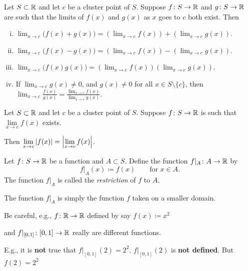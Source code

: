 \documentclass[10pt,aspectratio=169]{beamer}
\begin{document}
\begin{frame}

\begin{corollary}
Let $S \subset {\mathbb{R}}$ and let $c$ be a cluster point of $S$.  
Suppose $f \colon S \to {\mathbb{R}}$ and
$g \colon S \to {\mathbb{R}}$ are 
such that 
the limits of $f(x)$ and $g(x)$ as $x$ goes to $c$ both exist.
\pause
Then
\begin{enumerate}[(i)]
\item
$\displaystyle
\lim_{x\to c} \bigl(f(x)+g(x)\bigr) = \left(\lim_{x\to c} f(x)\right) + 
\left(\lim_{x\to c} g(x)\right) .
$
\item
\pause
$\displaystyle
\lim_{x\to c} \bigl(f(x)-g(x)\bigr) = \left(\lim_{x\to c} f(x)\right) -
\left(\lim_{x\to c} g(x)\right) .
$
\item
\pause
$\displaystyle
\lim_{x\to c} \bigl(f(x)g(x)\bigr) = \left(\lim_{x\to c} f(x)\right)
\left(\lim_{x\to c} g(x)\right) .
$
\item\pause\label{falg:cor:iv}
If
$\displaystyle \lim_{x\to c} g(x) \not= 0$,
and $g(x) \not= 0$ for all $x \in S \setminus \{ c \}$, then
$\displaystyle
\lim_{x\to c} \frac{f(x)}{g(x)} =
\frac{\lim_{x\to c} f(x)}{\lim_{x\to c} g(x)}$.
\end{enumerate}
\end{corollary}

\pause
\begin{corollary}
Let $S \subset {\mathbb{R}}$ and let $c$ be a cluster point of $S$.
Suppose $f \colon S \to {\mathbb{R}}$ is such that $\lim\limits_{x\to c} f(x)$ exists.

\pause
\medskip

Then
\quad
$\displaystyle
\lim_{x\to c} \left\lvert {f(x)} \right\rvert =
\left\lvert {\lim_{x\to c} f(x)} \right\rvert$.
\end{corollary}

\end{frame}

\begin{frame}

\begin{definition}
Let $f \colon S \to {\mathbb{R}}$ be a function and $A \subset S$.  Define the
function $f|_A \colon A \to {\mathbb{R}}$ by
\begin{equation*}
f|_A (x) \coloneqq f(x)  \qquad \text{for } x \in A.
\end{equation*}
\pause
The function
$f|_A$ is called the \emph{restriction} of $f$ to $A$.
\end{definition}

\pause
The function $f|_A$ is simply the function $f$ taken on a smaller domain.

\pause
\medskip

Be careful, e.g., $f \colon {\mathbb{R}} \to {\mathbb{R}}$ defined by say $f(x) \coloneqq x^2$

and $f|_{[0,1]} \colon [0,1] \to {\mathbb{R}}$ really are different functions.

\pause
\medskip

E.g., it is \textbf{not} true that $f|_{[0,1]}(2) = 2^2$.
\quad $f|_{[0,1]}(2)$ is
\textbf{not defined}. \quad But $f(2)=2^2$

\end{frame}
\end{document}
